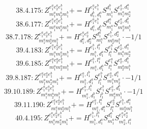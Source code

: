 \documentclass[letterpaper,10pt,fleqn,leqno,onecolumn]{article}
\begin{document}
\begin{equation} \;\;\;\;\;\;  38.4.175: Z^{e_{1}^{a}e_{2}^{a}e_{1}^{b}}_{m_{1}^{a}m_{2}^{a}m_{1}^{b}}+=H^{e_{1}^{a}e_{1}^{b}}_{d_{1}^{b},d_{1}^{a}}S^{d_{1}^{b}}_{m_{1}^{b}}S^{e_{2}^{a},d_{1}^{a}}_{m_{1}^{a}m_{2}^{a}} \end{equation}
\begin{equation} \;\;\;\;\;\;  38.6.177: Z^{e_{1}^{a}e_{2}^{a}e_{1}^{b}}_{m_{1}^{a}m_{2}^{a}m_{1}^{b}}+=H^{e_{1}^{a}e_{1}^{b}}_{d_{1}^{a},d_{1}^{b}}S^{d_{1}^{a}}_{m_{1}^{a}}S^{e_{2}^{a},d_{1}^{b}}_{m_{2}^{a}m_{1}^{b}} \end{equation}
\begin{equation} \;\;\;\;\;\;  38.7.178: Z^{e_{1}^{a}e_{2}^{a}e_{1}^{b}}_{m_{1}^{a}m_{2}^{a}m_{1}^{b}}+=H^{e_{1}^{a}e_{2}^{a}}_{d_{1}^{a},d_{2}^{a}}S^{d_{1}^{a}}_{m_{1}^{a}}S^{e_{1}^{b},d_{2}^{a}}_{m_{2}^{a}m_{1}^{b}}\cdot -1/1 \end{equation}
\begin{equation} \;\;\;\;\;\;  39.4.183: Z^{e_{1}^{a}e_{2}^{a}e_{1}^{b}}_{m_{1}^{a}m_{2}^{a}m_{1}^{b}}+=H^{e_{1}^{b},l_{1}^{a}}_{m_{1}^{b},d_{1}^{a}}S^{e_{1}^{a}}_{l_{1}^{a}}S^{e_{2}^{a},d_{1}^{a}}_{m_{1}^{a}m_{2}^{a}} \end{equation}
\begin{equation} \;\;\;\;\;\;  39.6.185: Z^{e_{1}^{a}e_{2}^{a}e_{1}^{b}}_{m_{1}^{a}m_{2}^{a}m_{1}^{b}}+=H^{e_{1}^{b},l_{1}^{a}}_{m_{1}^{a},d_{1}^{b}}S^{e_{1}^{a}}_{l_{1}^{a}}S^{e_{2}^{a},d_{1}^{b}}_{m_{2}^{a}m_{1}^{b}} \end{equation}
\begin{equation} \;\;\;\;\;\;  39.8.187: Z^{e_{1}^{a}e_{2}^{a}e_{1}^{b}}_{m_{1}^{a}m_{2}^{a}m_{1}^{b}}+=H^{e_{1}^{a},l_{1}^{b}}_{m_{1}^{b},d_{1}^{a}}S^{e_{1}^{b}}_{l_{1}^{b}}S^{e_{2}^{a},d_{1}^{a}}_{m_{1}^{a}m_{2}^{a}}\cdot -1/1 \end{equation}
\begin{equation} \;\;\;\;\;\;  39.10.189: Z^{e_{1}^{a}e_{2}^{a}e_{1}^{b}}_{m_{1}^{a}m_{2}^{a}m_{1}^{b}}+=H^{e_{1}^{a},l_{1}^{b}}_{m_{1}^{a},d_{1}^{b}}S^{e_{1}^{b}}_{l_{1}^{b}}S^{e_{2}^{a},d_{1}^{b}}_{m_{2}^{a}m_{1}^{b}}\cdot -1/1 \end{equation}
\begin{equation} \;\;\;\;\;\;  39.11.190: Z^{e_{1}^{a}e_{2}^{a}e_{1}^{b}}_{m_{1}^{a}m_{2}^{a}m_{1}^{b}}+=H^{e_{1}^{a},l_{1}^{a}}_{m_{1}^{a},d_{1}^{a}}S^{e_{2}^{a}}_{l_{1}^{a}}S^{e_{1}^{b},d_{1}^{a}}_{m_{2}^{a}m_{1}^{b}} \end{equation}
\begin{equation} \;\;\;\;\;\;  40.4.195: Z^{e_{1}^{a}e_{2}^{a}e_{1}^{b}}_{m_{1}^{a}m_{2}^{a}m_{1}^{b}}+=H^{e_{1}^{b},l_{1}^{a}}_{m_{1}^{b},d_{1}^{a}}S^{d_{1}^{a}}_{m_{1}^{a}}S^{e_{1}^{a}e_{2}^{a}}_{m_{2}^{a},l_{1}^{a}} \end{equation}
\end{document}
